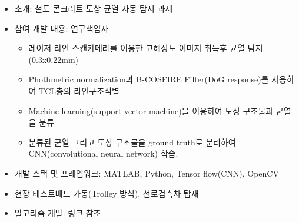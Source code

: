 
\begin{itemize}[label=]
	\item 소개: 철도 콘크리트 도상 균열 자동 탐지 과제
	\item 참여 개발 내용: 연구책임자
	      \begin{itemize}[label=]
		      \item 레이저 라인 스캔카메라를 이용한 고해상도 이미지 취득후 균열 탐지 (0.3x0.22mm)
		      \item Phothmetric normalization과 B-COSFIRE Filter(DoG response)를 사용하여 TCL층의 라인구조식별
		      \item Machine learning(support vector machine)을 이용하여 도상 구조물과 균열을 분류
		      \item 분류된 균열 그리고 도상 구조물을 ground truth로 분리하여 CNN(convolutional neural network) 학습.
	      \end{itemize}
	\item 개발 스택 및 프레임워크: MATLAB, Python, Tensor flow(CNN), OpenCV
	\item 현장 테스트베드 가동(Trolley 방식), 선로검측차 탑재
	\item 알고리즘 개발: \href{https://www.eunchurn.com/blog/engineering/2017-12-30-concrete-cracks-detection-using-b-cosfire-filter}{링크 참조}
\end{itemize}

